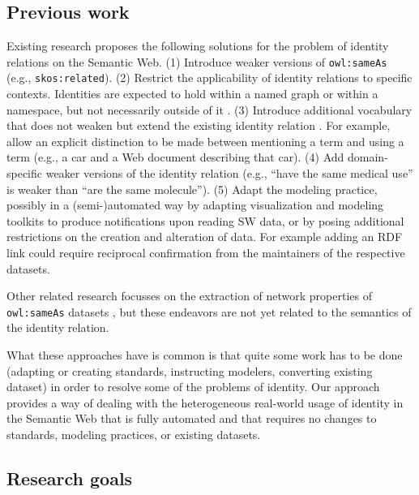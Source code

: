 \documentclass[letterpaper]{article}
\begin{document}
\subsection{Previous work}
\label{sec:previous_work}

Existing research proposes the following solutions for the problem of
  identity relations on the Semantic Web.
(1) Introduce weaker versions of \verb|owl:sameAs|
  \cite{halpin_hayes_2010,mccusker_mcguinness_2010}
  (e.g., \verb|skos:related|).
(2) Restrict the applicability of identity relations to specific contexts.
  Identities are expected to hold within a named graph or within a namespace,
  but not necessarily outside of it \cite{halpin_hayes_2010,melo_2013}.
(3) Introduce additional vocabulary that does not weaken but extend
  the existing identity relation \cite{halpin_hayes_2010}.
  For example, allow an explicit distinction to be made between mentioning
  a term and using a term
  (e.g., a car and a Web document describing that car).
(4) Add domain-specific weaker versions of the identity relation
  \cite{mccusker_mcguinness_2010} (e.g., ``have the same medical use''
  is weaker than ``are the same molecule'').
(5) Adapt the modeling practice, possibly in a (semi-)automated way
  by adapting visualization and modeling toolkits to produce notifications
  upon reading SW data, or by posing additional restrictions on the creation
  and alteration of data. For example adding an RDF link could require
  reciprocal confirmation from the maintainers of the respective datasets.
  \cite{halpin_hayes_2010,ding_shinavier_finin_mcguinness_2010}

Other related research focusses on the extraction of network properties of
  \verb|owl:sameAs| datasets \cite{ding_shinavier_shangguan_mcguinness_2010},
  but these endeavors are not yet related to the semantics of the
  identity relation.

What these approaches have is common is that quite some work has to be done
  (adapting or creating standards, instructing modelers, converting existing
  dataset) in order to resolve some of the problems of identity.
Our approach provides a way of dealing with the heterogeneous real-world usage
  of identity in the Semantic Web that is fully automated and that requires
  no changes to standards, modeling practices, or existing datasets.

\subsection{Research goals}
\label{sec:research_goals}
\end{document}
